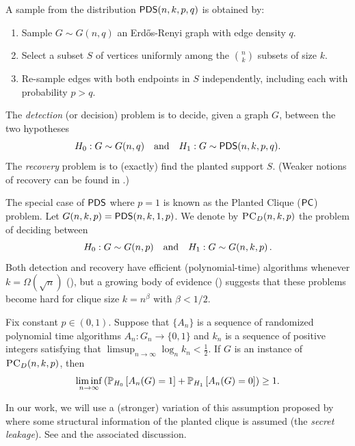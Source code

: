 \documentclass[final,12pt]{colt2023} %
\newcommand\1[1]{\mathbb{I}_{\left\{#1\right\}}}
\begin{document}
A sample from the distribution $\pd(n, k, p, q)$ is obtained by:
    \begin{enumerate}
        \item Sample $G\sim G(n, q)$ an Erd\H{o}s-Renyi graph with edge density $q$.
        \item Select a subset $S$ of vertices  uniformly among the ${n\choose k}$ subsets of size $k$.
        \item Re-sample edges with both endpoints in $S$ independently, including each with probability $p>q$.
    \end{enumerate}
    The \emph{detection} (or decision) problem is to decide, given a graph $G$, between the two hypotheses
    \begin{equation}
        H_0: G\sim G(n, q)\quadand H_1: G\sim \pd(n, k, p, q).
    \end{equation}
The \emph{recovery} problem is to (exactly) find the planted support $S$. (Weaker notions of recovery can be found in .)

The special case of $\pd$ where $p=1$ is known as the Planted Clique ($\pc$) problem. Let $G(n,k,p)=\pd(n,k,1,p)$. We denote by $\textsc{PC}_D(n, k, p)$ the problem of deciding between
$$H_0: G\sim G(n, p)\quadand H_1: G\sim G(n, k, p)\,.$$ Both detection and recovery have efficient (polynomial-time) algorithms whenever $k=\Omega(\sqrt{n})$ (\cite{alon1998finding}), but
a growing body of evidence (\cite{BHK16,feldman2017statistical}) suggests that these problems become hard for clique size $k=n^\beta$ with $\beta<1/2$.

\begin{conjecture}[PC Conjecture] \label{pcconjecture}
Fix constant $p \in (0, 1)$. Suppose that $\{ A_n \}$ is a sequence of randomized polynomial time algorithms $A_n : G_n \to \{0, 1\}$ and $k_n$ is a sequence of positive integers satisfying that $\limsup_{n \to \infty} \log_n k_n < \frac{1}{2}$. If $G$ is an instance of $\textsc{PC}_D(n, k, p)$, then
$$\liminf_{n \to \infty} \left( \P_{H_0}\left[A_n(G) = 1\right] + \P_{H_1}\left[A_n(G) = 0\right] \right) \ge 1.$$ 
\end{conjecture}
In our work, we will use a (stronger) variation of this assumption proposed by \cite{BB20} where some structural information of the planted clique is assumed (the \emph{secret leakage}). See  and the associated discussion.
\end{document}
